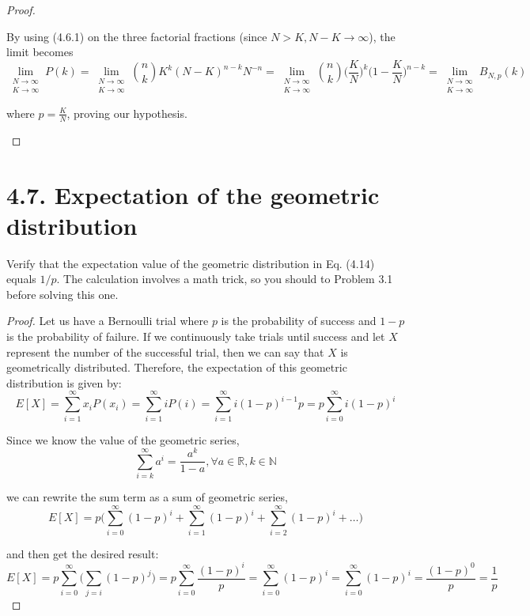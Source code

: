 \begin{proof}
\begin{enumerate}[(a)]
            By using (4.6.1) on the three factorial fractions (since $N > K, N - K \to \infty$), 
            the limit becomes
            \[
                \lim_{\substack{N \to \infty \\ K \to \infty}} P(k) 
                = \lim_{\substack{N \to \infty \\ K \to \infty}} \binom{n}{k} K^k (N - K)^{n - k} N^{-n}
                = \lim_{\substack{N \to \infty \\ K \to \infty}} \binom{n}{k} \bigg(\frac{K}{N}\bigg)^k 
                    \bigg(1 - \frac{K}{N}\bigg)^{n - k} 
                    = \lim_{\substack{N \to \infty \\ K \to \infty}} B_{N, p}(k)
            \] 

            where $p = \frac{K}{N}$, proving our hypothesis.
    \end{enumerate}
\end{proof}

\section*{4.7. Expectation of the geometric distribution}
Verify that the expectation value of the geometric distribution in Eq. (4.14)
equals $1/p$. The calculation involves a math trick, so you should to Problem 3.1
before solving this one.

\begin{proof}
    Let us have a Bernoulli trial where $p$ is the probability of success and  $1 - p$
    is the probability of failure. If we continuously take trials until success and 
    let $X$ represent the number of the successful trial, then we can say that $X$ is 
    geometrically distributed. 
    Therefore, the expectation of this geometric distribution is given by:
    \[
        E[X] = \sum_{i = 1}^\infty  x_iP(x_i) = \sum_{i = 1}^\infty iP(i) = \sum_{i = 1}^\infty  i (1 - p)^{i - 1} p 
        = p \sum_{i = 0}^\infty i(1 - p)^i
    \] 

    Since we know the value of the geometric series,
    \[
        \sum_{i = k}^\infty  a^i = \frac{a^k}{1 - a}, \forall a \in \mathbb{R}, k \in \mathbb{N}
    \] 

    we can rewrite the sum term as a sum of geometric series, 
    \[
        E[X] = p\bigg(\sum_{i = 0}^\infty (1 - p)^i + \sum_{i = 1}^\infty  (1 - p)^i + \sum_{i = 2}^\infty  (1 - p)^i + \ldots \bigg)
    \]

    and then get the desired result:
    \[
        E[X] = p \sum_{i = 0}^\infty \bigg(\sum_{j = i} (1 - p)^j\bigg) = p \sum_{i = 0}^\infty \frac{(1 - p)^i}{p} 
        = \sum_{i = 0}^\infty (1 - p)^i = \sum_{i = 0}^\infty (1 - p)^i = \frac{(1 - p)^0}{p} = \frac{1}{p}
    \] 
\end{proof}

